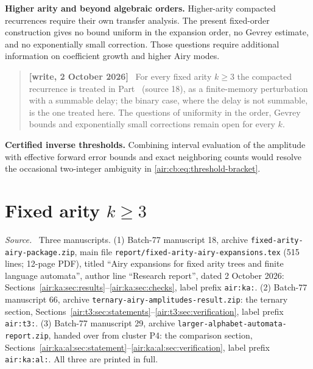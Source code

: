 \documentclass[11pt,letterpaper]{article}
\numberwithin{equation}{section}
\theoremstyle{remark}
\newenvironment{writenote}{\par\smallskip\begin{quote}\small\textbf{[write, 2 October 2026]}\ }{\end{quote}\smallskip}
\newenvironment{partsource}{\par\medskip\noindent\begin{minipage}{\linewidth}\small\raggedright\textit{Source.}\ }{\end{minipage}\par\medskip}
\newcommand{\repopath}[1]{\nolinkurl{#1}}
\begin{document}
\textbf{Higher arity and beyond algebraic orders.}
Higher-arity compacted recurrences require their own transfer analysis.
The present fixed-order construction gives no bound uniform in the expansion
order, no Gevrey estimate, and no exponentially small correction. Those
questions require additional information on coefficient growth and higher
Airy modes.
\begin{writenote}
For every fixed arity $k\ge3$ the compacted recurrence is treated in Part~\ref{air:part:ka} (source 18), as a finite-memory perturbation with a summable delay; the binary case, where the delay is not summable, is the one treated here. The questions of uniformity in the order, Gevrey bounds and exponentially small corrections remain open for every $k$.
\end{writenote}


\textbf{Certified inverse thresholds.}
Combining interval evaluation of the amplitude with effective forward error
bounds and exact neighboring counts would resolve the occasional two-integer
ambiguity in \eqref{air:cb:eq:threshold-bracket}.


\part{Fixed arity \texorpdfstring{$k\ge3$}{k >= 3}}\label{air:part:ka}

\begin{partsource}
Three manuscripts. (1) Batch-77 manuscript 18, archive \repopath{fixed-arity-airy-package.zip}, main file \repopath{report/fixed-arity-airy-expansions.tex} (515 lines; 12-page PDF), titled ``Airy expansions for fixed arity trees and finite language automata'', author line ``Research report'', dated 2 October 2026: Sections~\ref{air:ka:sec:results}--\ref{air:ka:sec:checks}, label prefix \texttt{air:ka:}. (2) Batch-77 manuscript 66, archive \repopath{ternary-airy-amplitudes-result.zip}: the ternary section, Sections~\ref{air:t3:sec:statements}--\ref{air:t3:sec:verification}, label prefix \texttt{air:t3:}. (3) Batch-77 manuscript 29, archive \repopath{larger-alphabet-automata-report.zip}, handed over from cluster P4: the comparison section, Sections~\ref{air:ka:al:sec:statement}--\ref{air:ka:al:sec:verification}, label prefix \texttt{air:ka:al:}. All three are printed in full.
\end{partsource}
\end{document}
